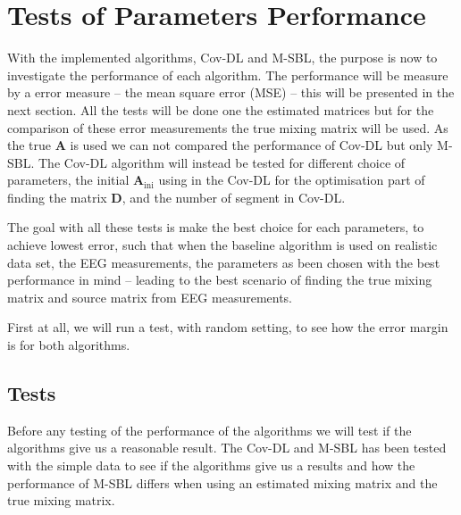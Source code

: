 \section{Tests of Parameters Performance}
With the implemented algorithms, Cov-DL and M-SBL, the purpose is now to investigate the performance of each algorithm. The performance will be measure by a error measure -- the mean square error (MSE) -- this will be presented in the next section. 
All the tests will be done one the estimated matrices but for the comparison of these error measurements the true mixing matrix will be used. 
As the true $\mathbf{A}$ is used we can not compared the performance of Cov-DL but only M-SBL. 
The Cov-DL algorithm will instead be tested for different choice of parameters, the initial $\mathbf{A}_{\text{ini}}$ using in the Cov-DL for the optimisation part of finding the matrix $\mathbf{D}$, and the number of segment in Cov-DL.

The goal with all these tests is make the best choice for each parameters, to achieve lowest error, such that when the baseline algorithm is used on realistic data set, the EEG measurements, the parameters as been chosen with the best performance in mind -- leading to the best scenario of finding the true mixing matrix and source matrix from EEG measurements.

First at all, we will run a test, with random setting, to see how the error margin is for both algorithms.


\subsection{Tests}

Before any testing of the performance of the algorithms we will test if the algorithms give us a reasonable result. The Cov-DL and M-SBL has been tested with the simple data to see if the algorithms give us a results and how the performance of M-SBL differs when using an estimated mixing matrix and the true mixing matrix.

